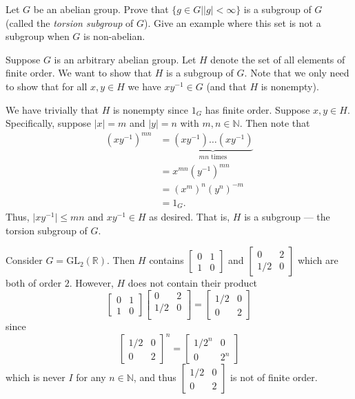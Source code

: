 \documentclass[12 pt, letterpaper]{hmcpset}
\begin{document}
\begin{problem}
	Let $G$ be an abelian group. Prove that $\{ g \in G | \lvert g \rvert < \infty \}$ is a subgroup of $G$ (called the \textit{torsion subgroup} of $G$). Give an example where this set is not a subgroup when $G$ is non-abelian.
\end{problem}

\begin{solution} 
	Suppose $G$ is an arbitrary abelian group. Let $H$ denote the set of all elements of finite order. We want to show that $H$ is a subgroup of $G$. Note that we only need to show that for all $x, y \in H$ we have $xy^{-1} \in G$ (and that $H$ is nonempty). 

	We have trivially that $H$ is nonempty since $1_G$ has finite order. Suppose $x, y \in H$. Specifically, suppose $\lvert x \rvert = m$ and $\lvert y \rvert = n$ with $m, n \in \mathbb{N}$. Then note that
	\[
		\begin{split}
			(xy^{-1})^{mn} & = \underbrace{(xy^{-1}) \dots (xy^{-1})}_{mn \text{ times}} \\
				       & = x^{mn} (y^{-1})^{mn} \\
				       & = (x^{m})^n (y^n)^{-m} \\
				       & = 1_G.
		\end{split}
	\]
	Thus, $\lvert xy^{-1} \rvert \le mn$ and $xy^{-1} \in H$ as desired. That is, $H$ is a subgroup --- the torsion subgroup of $G$.

	Consider $G = \mathrm{GL}_2(\mathbb{R})$. Then $H$ contains $\begin{bmatrix}
			0 & 1 \\
			1 & 0
		\end{bmatrix}$ and $\begin{bmatrix}
			0 & 2 \\
			1/2 & 0
		\end{bmatrix}$ which are both of order $2$. However, $H$ does not contain their product
		\[
			\begin{bmatrix}
				0 & 1 \\
				1 & 0
			\end{bmatrix}
			\begin{bmatrix}
				0 & 2 \\
				1/2 & 0 \\
			\end{bmatrix} = 
			\begin{bmatrix}
				1/2 & 0 \\
				0 & 2
			\end{bmatrix}
		\]
		since
		\[
			\begin{bmatrix}
				1/2 & 0 \\
				0 & 2
			\end{bmatrix}^n =
			\begin{bmatrix}
				1/2^n & 0 \\
				0 & 2^n
			\end{bmatrix}
		\]
		which is never $I$ for any $n \in \mathbb{N}$, and thus $\begin{bmatrix}
			1/2 & 0 \\
			0 & 2
		\end{bmatrix}$ is not of finite order.
\end{solution}
\end{document}
